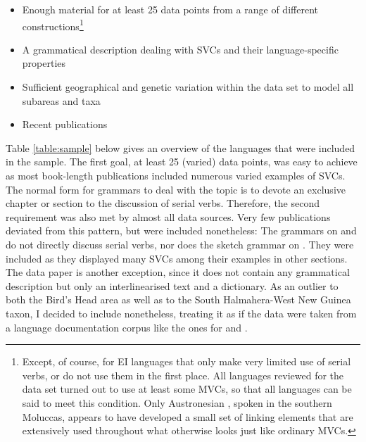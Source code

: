 \begin{footnotesize}
\begin{itemize}
\item Enough material for at least 25 data points from a range of different constructions\footnote{Except, of course, for EI languages that only make very limited use of serial verbs, or do not use them in the first place. All languages reviewed for the data set turned out to use at least some MVCs, so that all languages can be said to meet this condition. Only Austronesian , spoken in the southern Moluccas, appears to have developed a small set of linking elements that are extensively used throughout what otherwise looks just like ordinary MVCs.}
\item A grammatical description dealing with SVCs and their language-specific properties
\item Sufficient geographical and genetic variation within the data set to model all subareas and taxa
\item Recent publications
\end{itemize}
\end{footnotesize}

Table \ref{table:sample} below gives an overview of the languages that were included in the sample. The first goal, at least 25 (varied) data points, was easy to achieve as most book-length publications included numerous varied examples of SVCs. The normal form for grammars to deal with the topic is to devote an exclusive chapter or section to the discussion of serial verbs. Therefore, the second requirement was also met by almost all data sources. Very few publications deviated from this pattern, but were included nonetheless: The grammars on  \citep{berry1999} and  \citep{huber2011} do not directly discuss serial verbs, nor does the sketch grammar on  \citep{dalrymple2012}. They were included as they displayed many SVCs among their examples in other sections. The  data paper \citep{kamholz2009} is another exception, since it does not contain any grammatical description but only an interlinearised text and a dictionary. As an outlier to both the Bird's Head area as well as to the South Halmahera-West New Guinea taxon, I decided to include  nonetheless, treating it as if the data were taken from a language documentation corpus like the ones for  and .

